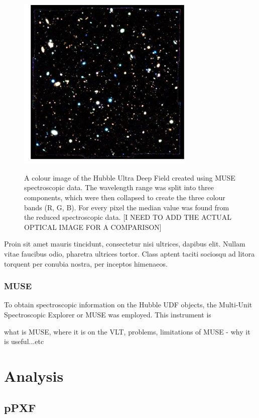 \documentclass[12pt, twocolumn]{revtex4}    %
\begin{document}
\begin{figure}[!h]
\begin{center}
\includegraphics[width=8.5cm]{diagrams/muse_colour_image}
\caption[]{A colour image of the Hubble Ultra Deep Field created using MUSE spectroscopic data. The wavelength range was split into three components, which were then collapsed to create the three colour bands (R, G, B). For every pixel the median value was found from the reduced spectroscopic data. [I NEED TO ADD THE ACTUAL OPTICAL IMAGE FOR A COMPARISON]}
\vspace{-5ex}
\label{fig:muse_colour_image}
\end{center}
\end{figure}

Proin sit amet mauris tincidunt, consectetur nisi ultrices, dapibus elit. Nullam vitae faucibus odio, pharetra ultrices tortor. Class aptent taciti sociosqu ad litora torquent per conubia nostra, per inceptos himenaeos. 

\subsubsection{MUSE} 

To obtain spectroscopic information on the Hubble UDF objects, the Multi-Unit Spectroscopic Explorer or MUSE was employed. This instrument is 

what is MUSE, where it is on the VLT, problems, limitations of MUSE - why it is useful...etc

\section{Analysis} 

\subsection{pPXF} 
\end{document}
